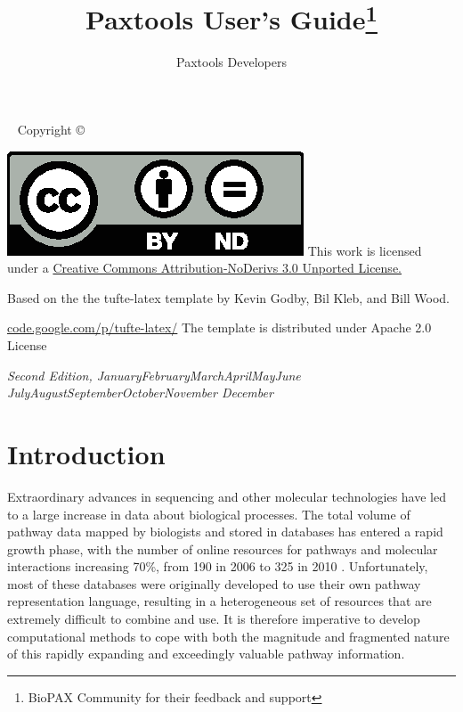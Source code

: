 \documentclass{tufte-book}
\title{Paxtools User's Guide\thanks{BioPAX Community for their feedback and support}}
\author[Paxtools Developers]{Paxtools Developers}
\newcommand{\monthyear}{%
\ifcase\month\or January\or February\or March\or April\or May\or June\or
July\or August\or September\or October\or November\or
December\fi\space\number\year
}
\begin{document}
\maketitle


\newpage
\begin{fullwidth}
~\vfill
\thispagestyle{empty}
\setlength{\parindent}{0pt}
\setlength{\parskip}{\baselineskip}
Copyright \copyright\ \the\year\ \thanklessauthor


\par{}

\par \includegraphics[width=\linewidth/10]{by-nd.eps}  This work is licensed under a \href{http://creativecommons.org/licenses/by-nd/3.0/deed.en_US} {Creative Commons Attribution-NoDerivs 3.0 Unported License.} 
\par Based on the the tufte-latex template by Kevin Godby, Bil Kleb, and Bill Wood. 
\par \url{code.google.com/p/tufte-latex/} The template is distributed under Apache 2.0 License
\par\textit{Second Edition, \monthyear}
\end{fullwidth}

\tableofcontents


\cleardoublepage
\chapter*{Introduction}

Extraordinary advances in sequencing and other molecular technologies have led to a large increase in data about biological processes. The total volume of pathway data mapped by biologists and stored in databases has entered a rapid growth phase, with the number of online resources for pathways and molecular interactions increasing 70\%, from 190 in 2006 to 325 in 2010 \cite{Bader2006}. Unfortunately, most of these databases were originally developed to use their own pathway representation language, resulting in a heterogeneous set of resources that are extremely difficult to combine and use. It is therefore imperative to develop computational methods to cope with both the magnitude and fragmented nature of this rapidly expanding and exceedingly valuable pathway information.
\end{document}
